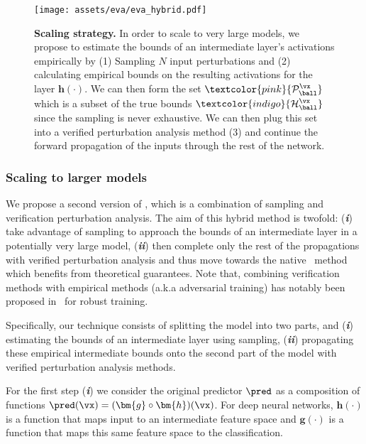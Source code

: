 \begin{figure*}[t!]
  \centering
  \texttt{[image: assets/eva/eva\_hybrid.pdf]}
  \caption{\textbf{Scaling strategy.} 
  In order to scale to very large models, we propose to estimate the bounds of an intermediate layer's activations empirically by (1) Sampling $N$ input perturbations and (2) calculating empirical bounds on the resulting activations for the layer $\bm{h}(\cdot)$. 
  We can then form the set $\textcolor{pink}{\mathcal{P}_{\ball}^{\vx}}$ which is a subset of the true bounds $\textcolor{indigo}{\mathcal{H}_{\ball}^{\vx}}$ since the sampling is never exhaustive. We can then plug this set into a verified perturbation analysis method (3) and continue the forward propagation of the inputs through the rest of the network.
  }
  
  \label{fig:eva:eva_hybrid}
\end{figure*}

\subsubsection{Scaling to larger models}
\label{sec:eva:scaling}

We propose a second version of \eva, 
which is a combination of sampling and verification perturbation analysis. 
The aim of this hybrid method is twofold: (\textit{\textbf{i}}) take advantage of sampling to approach the bounds of an intermediate layer in a potentially very large model, (\textit{\textbf{ii}}) then complete only the rest of the propagations with verified perturbation analysis and thus move towards the native \eva~method which benefits from theoretical guarantees.
Note that, combining verification methods with empirical methods (a.k.a adversarial training) has notably been proposed in~\cite{balunovic2019adversarial} for robust training.

Specifically, our technique consists of splitting the model into two parts, and (\textit{\textbf{i}}) estimating the bounds of an intermediate layer using sampling, (\textit{\textbf{ii}}) propagating these empirical intermediate bounds onto the second part of the model with verified perturbation analysis methods.

For the first step (\textit{\textbf{i}}) we consider the original predictor $\pred$ as a composition of functions 
$\pred(\vx) = (\bm{g} \circ \bm{h})(\vx)$. 
For deep neural networks, $\bm{h}(\cdot)$ is a function that maps input to an intermediate feature space
and $\bm{g}(\cdot)$ is a function that maps this same feature space to the classification.


